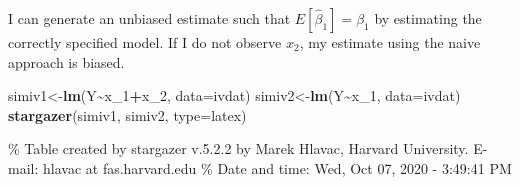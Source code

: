 \documentclass[
]{article}
\newenvironment{Shaded}{\begin{snugshade}}{\end{snugshade}}
\newcommand{\CommentTok}[1]{\textcolor[rgb]{0.56,0.35,0.01}{\textit{#1}}}
\newcommand{\DataTypeTok}[1]{\textcolor[rgb]{0.13,0.29,0.53}{#1}}
\newcommand{\DecValTok}[1]{\textcolor[rgb]{0.00,0.00,0.81}{#1}}
\newcommand{\KeywordTok}[1]{\textcolor[rgb]{0.13,0.29,0.53}{\textbf{#1}}}
\newcommand{\NormalTok}[1]{#1}
\newcommand{\OperatorTok}[1]{\textcolor[rgb]{0.81,0.36,0.00}{\textbf{#1}}}
\newcommand{\StringTok}[1]{\textcolor[rgb]{0.31,0.60,0.02}{#1}}
\begin{document}
\begin{Shaded}
\end{Shaded}

I can generate an unbiased estimate such that
\(E[\hat{\beta}_1]=\beta_1\) by estimating the correctly specified
model. If I do not observe \(x_2\), my estimate using the naive approach
is biased.

\begin{Shaded}
\begin{Highlighting}[]
\NormalTok{simiv1\textless{}{-}}\KeywordTok{lm}\NormalTok{(Y}\OperatorTok{\textasciitilde{}}\NormalTok{x\_}\DecValTok{1}\OperatorTok{+}\NormalTok{x\_}\DecValTok{2}\NormalTok{, }\DataTypeTok{data=}\NormalTok{ivdat)}
\NormalTok{simiv2\textless{}{-}}\KeywordTok{lm}\NormalTok{(Y}\OperatorTok{\textasciitilde{}}\NormalTok{x\_}\DecValTok{1}\NormalTok{, }\DataTypeTok{data=}\NormalTok{ivdat)}
\KeywordTok{stargazer}\NormalTok{(simiv1, simiv2,  }\DataTypeTok{type=}\StringTok{\textquotesingle{}latex\textquotesingle{}}\NormalTok{)}
\end{Highlighting}
\end{Shaded}

\% Table created by stargazer v.5.2.2 by Marek Hlavac, Harvard
University. E-mail: hlavac at fas.harvard.edu \% Date and time: Wed, Oct
07, 2020 - 3:49:41 PM
\end{document}
